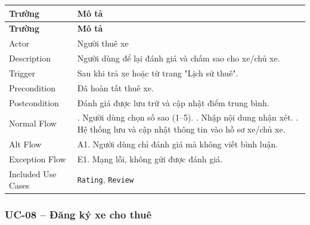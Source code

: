 \begin{longtable}{|>{\raggedright\arraybackslash}p{4cm}|>{\raggedright\arraybackslash}p{11cm}|}
\hline
\textbf{Trường} & \textbf{Mô tả} \\
\hline
\endfirsthead

\hline
\textbf{Trường} & \textbf{Mô tả} \\
\hline
\endhead

\hline
\endfoot

Actor & Người thuê xe \\
\hline
Description & Người dùng để lại đánh giá và chấm sao cho xe/chủ xe. \\
\hline
Trigger & Sau khi trả xe hoặc từ trang "Lịch sử thuê". \\
\hline
Precondition & Đã hoàn tất thuê xe. \\
\hline
Postcondition & Đánh giá được lưu trữ và cập nhật điểm trung bình. \\
\hline
Normal Flow & 1. Người dùng chọn số sao (1--5). \newline 2. Nhập nội dung nhận xét. \newline 3. Hệ thống lưu và cập nhật thông tin vào hồ sơ xe/chủ xe. \\
\hline
Alt Flow & A1. Người dùng chỉ đánh giá mà không viết bình luận. \\
\hline
Exception Flow & E1. Mạng lỗi, không gửi được đánh giá. \\
\hline
Included Use Cases & \texttt{Rating}, \texttt{Review} \\
\hline
\end{longtable}

\subsubsection*{UC-08 – Đăng ký xe cho thuê}

